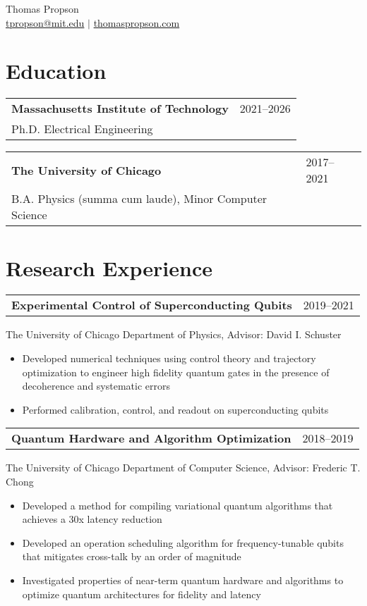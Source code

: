 \documentclass[letterpaper, 11pt]{article}
\begin{document}
\begin{center}
{\large Thomas Propson} \\[5pt]
\href{mailto:tpropson@mit.edu}{tpropson@mit.edu} $\vert$
\href{https://thomaspropson.com}{thomaspropson.com}
\end{center}


\flushleft

\section{Education}
\begin{tabular}{@{} L{12cm} @{} R{4.51cm} @{}}
  \textbf{Massachusetts Institute of Technology} & 2021--2026\\
  Ph.D. Electrical Engineering\\
\end{tabular}
\begin{tabular}{@{} L{12cm} @{} R{4.51cm} @{}}
  \textbf{The University of Chicago} & 2017--2021\\
  B.A. Physics (summa cum laude), Minor Computer Science\\
\end{tabular}

\section{Research Experience}
\begin{tabular}{@{} L{12cm} @{} R{4.51cm} @{}}
  \textbf{Experimental Control of Superconducting Qubits} & 2019--2021\\
\end{tabular}
The University of Chicago Department of Physics, Advisor: David I. Schuster\\
\begin{itemize}
  \item Developed numerical techniques using control theory and trajectory optimization
    to engineer high fidelity quantum gates in the presence of decoherence and systematic errors
  \item Performed calibration, control, and readout on superconducting qubits
\end{itemize}

\begin{tabular}{@{} L{12cm} @{} R{4.51cm} @{}}
  \textbf{Quantum Hardware and Algorithm Optimization} & 2018--2019\\
\end{tabular}
The University of Chicago Department of Computer Science, Advisor: Frederic T. Chong
\begin{itemize}
\item Developed a method for compiling variational quantum algorithms
  that achieves a 30x latency reduction
\item Developed an operation scheduling algorithm for
  frequency-tunable qubits that mitigates cross-talk by an order of magnitude
\item Investigated properties of near-term quantum hardware and algorithms
  to optimize quantum architectures for fidelity and latency
\end{itemize}
\end{document}
